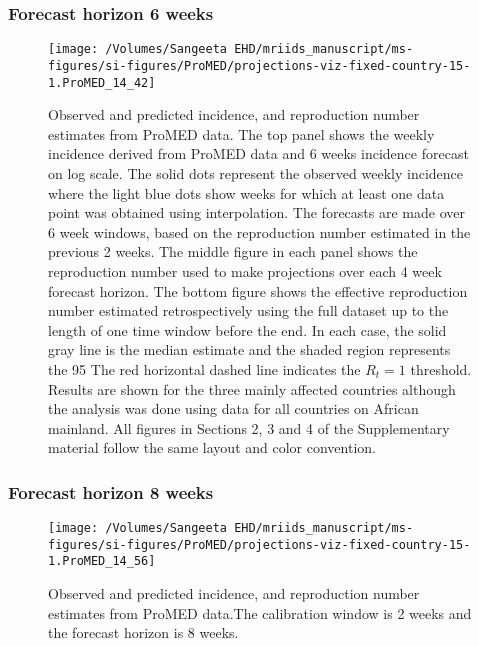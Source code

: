 \documentclass[9pt,twoside,lineno]{pnas-new}
\begin{document}
\hypertarget{forecast-horizon-6-weeks}{%
  \subsubsection{Forecast horizon 6 weeks}\label{forecast-horizon-6-weeks}}

\begin{figure}
  \centering
  \texttt{[image: /Volumes/Sangeeta EHD/mriids\_manuscript/ms-figures/si-figures/ProMED/projections-viz-fixed-country-15-1.ProMED\_14\_42]} 
  \caption{Observed and predicted
    incidence, and reproduction number estimates from ProMED data.
    The top panel shows the weekly incidence derived from ProMED
    data and 6 weeks incidence forecast on log scale.
    The solid dots represent the observed weekly incidence where
    the light blue dots show
    weeks for which at least one data point was obtained using
    interpolation. The forecasts are made over 6 week windows, based on the
    reproduction number estimated in the previous 2 weeks.
    The middle figure in each panel shows the reproduction number
    used to make projections over each 4 week forecast horizon.
    The bottom figure shows the effective reproduction number estimated
    retrospectively using the full dataset up to the length of one time window before the end.
    In each case, the solid gray line is the median
    estimate and the shaded region represents the 95%
    The red horizontal dashed line indicates the $R_t = 1$ threshold.
    Results are shown for the three mainly affected countries although the
    analysis was done using data for all countries on African mainland.
    All figures in Sections 2, 3 and 4 of the Supplementary material follow
    the same layout and color convention. }
  \label{fig:pm26}
\end{figure}

\hypertarget{forecast-horizon-8-weeks}{%
  \subsubsection{Forecast horizon 8 weeks}\label{forecast-horizon-8-weeks}}

\begin{figure}
  {
    \centering \texttt{[image: /Volumes/Sangeeta EHD/mriids\_manuscript/ms-figures/si-figures/ProMED/projections-viz-fixed-country-15-1.ProMED\_14\_56]} 

  }
  \caption{Observed and predicted incidence, and reproduction number
    estimates from ProMED data.The calibration window is 2 weeks and
    the forecast horizon is 8 weeks.}
  \label{fig:pm28}
\end{figure}
\end{document}
